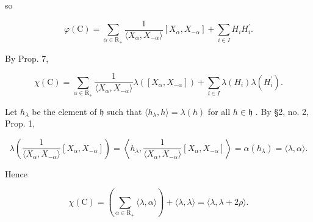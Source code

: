 so

\[
\varphi (\mathrm{C}) = \sum_ {\alpha \in \mathrm{R} _ {+}} \frac {1}{\langle X _ {\alpha} , X _ {- \alpha} \rangle} [ X _ {\alpha}, X _ {- \alpha} ] + \sum_ {i \in I} H _ {i} H _ {i} ^ {\prime}.
\]

By Prop. 7,

\[
\chi (\mathrm{C}) = \sum_ {\alpha \in \mathrm{R} _ {+}} \frac {1}{\langle X _ {\alpha} , X _ {- \alpha} \rangle} \lambda ([ X _ {\alpha}, X _ {- \alpha} ]) + \sum_ {i \in I} \lambda (H _ {i}) \lambda (H _ {i} ^ {\prime}).
\]

Let \(h_{\lambda}\) be the element of \(\mathfrak{h}\) such that \(\langle h_{\lambda}, h \rangle = \lambda(h)\) for all \(h \in \mathfrak{h}\) . By §2, no. 2, Prop. 1,

\[
\lambda \left(\frac {1}{\langle X _ {\alpha} , X _ {- \alpha} \rangle} [ X _ {\alpha}, X _ {- \alpha} ]\right) = \left\langle h _ {\lambda}, \frac {1}{\langle X _ {\alpha} , X _ {- \alpha} \rangle} [ X _ {\alpha}, X _ {- \alpha} ] \right\rangle = \alpha (h _ {\lambda}) = \langle \lambda , \alpha \rangle .
\]

Hence

\[
\chi (\mathrm{C}) = \left(\sum_ {\alpha \in \mathrm{R} _ {+}} \langle \lambda , \alpha \rangle\right) + \langle \lambda , \lambda \rangle = \langle \lambda , \lambda + 2 \rho \rangle .
\]

